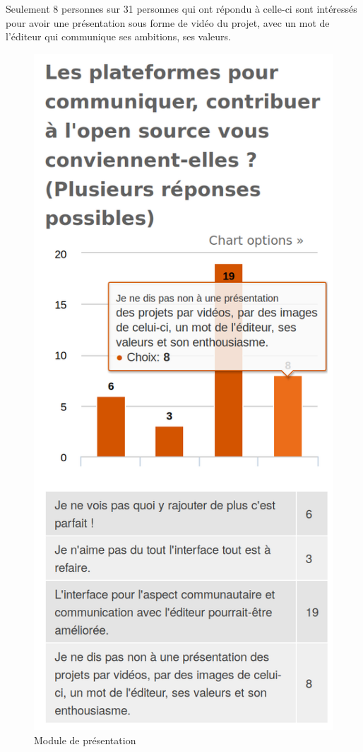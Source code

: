 			Seulement 8 personnes sur 31 personnes qui ont répondu à celle-ci sont intéressés pour avoir une présentation sous forme de vidéo du projet, avec un mot de l'éditeur qui communique ses ambitions, ses valeurs.

			\begin{figure}[ht]
				\center
				\includegraphics[scale=0.28]{./img/a92}
				\caption{Module de présentation}
			\end{figure}

